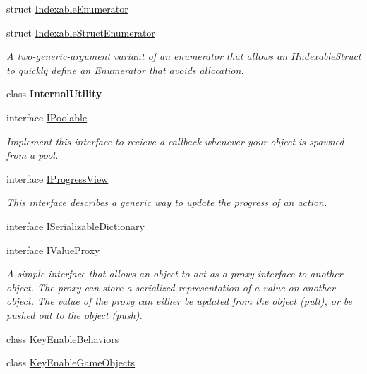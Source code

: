 \begin{DoxyCompactItemize}
\item 
struct \mbox{\hyperlink{struct_leap_1_1_unity_1_1_indexable_enumerator}{Indexable\+Enumerator}}
\item 
struct \mbox{\hyperlink{struct_leap_1_1_unity_1_1_indexable_struct_enumerator}{Indexable\+Struct\+Enumerator}}
\begin{DoxyCompactList}\small\item\em A two-\/generic-\/argument variant of an enumerator that allows an \mbox{\hyperlink{interface_leap_1_1_unity_1_1_i_indexable_struct}{I\+Indexable\+Struct}} to quickly define an Enumerator that avoids allocation. \end{DoxyCompactList}\item 
class {\bfseries Internal\+Utility}
\item 
interface \mbox{\hyperlink{interface_leap_1_1_unity_1_1_i_poolable}{I\+Poolable}}
\begin{DoxyCompactList}\small\item\em Implement this interface to recieve a callback whenever your object is spawned from a pool. \end{DoxyCompactList}\item 
interface \mbox{\hyperlink{interface_leap_1_1_unity_1_1_i_progress_view}{I\+Progress\+View}}
\begin{DoxyCompactList}\small\item\em This interface describes a generic way to update the progress of an action. \end{DoxyCompactList}\item 
interface \mbox{\hyperlink{interface_leap_1_1_unity_1_1_i_serializable_dictionary}{I\+Serializable\+Dictionary}}
\item 
interface \mbox{\hyperlink{interface_leap_1_1_unity_1_1_i_value_proxy}{I\+Value\+Proxy}}
\begin{DoxyCompactList}\small\item\em A simple interface that allows an object to act as a \textquotesingle{}proxy\textquotesingle{} interface to another object. The proxy can store a serialized representation of a value on another object. The value of the proxy can either be updated from the object (pull), or be pushed out to the object (push). \end{DoxyCompactList}\item 
class \mbox{\hyperlink{class_leap_1_1_unity_1_1_key_enable_behaviors}{Key\+Enable\+Behaviors}}
\item 
class \mbox{\hyperlink{class_leap_1_1_unity_1_1_key_enable_game_objects}{Key\+Enable\+Game\+Objects}}

\end{DoxyCompactItemize}
